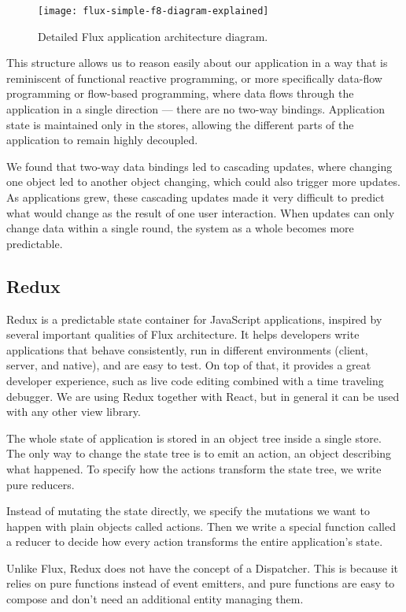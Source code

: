 \begin{figure}[ht!]
\centering
\texttt{[image: flux-simple-f8-diagram-explained]}
\caption{Detailed Flux application architecture diagram.}
\label{r:43}
\end{figure}

This structure allows us to reason easily about our application in a way that is reminiscent of functional reactive programming, or more specifically data-flow programming or flow-based programming, where data flows through the application in a single direction — there are no two-way bindings. Application state is maintained only in the stores, allowing the different parts of the application to remain highly decoupled.

We found that two-way data bindings led to cascading updates, where changing one object led to another object changing, which could also trigger more updates. As applications grew, these cascading updates made it very difficult to predict what would change as the result of one user interaction. When updates can only change data within a single round, the system as a whole becomes more predictable.\citep{flux}

\subsection{Redux}
Redux is a predictable state container for JavaScript applications, inspired by several important qualities of Flux architecture. It helps developers write applications that behave consistently, run in different environments (client, server, and native), and are easy to test. On top of that, it provides a great developer experience, such as live code editing combined with a time traveling debugger.\citep{redux-intro} We are using Redux together with React, but in general it can be used with any other view library.

The whole state of application is stored in an object tree inside a single store. The only way to change the state tree is to emit an action, an object describing what happened. To specify how the actions transform the state tree, we write pure reducers.\citep{redux-intro}

Instead of mutating the state directly, we specify the mutations we want to happen with plain objects called actions. Then we write a special function called a reducer to decide how every action transforms the entire application's state.\citep{redux-intro}

Unlike Flux, Redux does not have the concept of a Dispatcher. This is because it relies on pure functions instead of event emitters, and pure functions are easy to compose and don't need an additional entity managing them.

